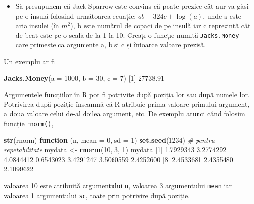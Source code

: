 \documentclass[]{article}
\newenvironment{Shaded}{\begin{snugshade}}{\end{snugshade}}
\newcommand{\KeywordTok}[1]{\textcolor[rgb]{0.13,0.29,0.53}{\textbf{#1}}}
\newcommand{\DataTypeTok}[1]{\textcolor[rgb]{0.13,0.29,0.53}{#1}}
\newcommand{\DecValTok}[1]{\textcolor[rgb]{0.00,0.00,0.81}{#1}}
\newcommand{\FloatTok}[1]{\textcolor[rgb]{0.00,0.00,0.81}{#1}}
\newcommand{\StringTok}[1]{\textcolor[rgb]{0.31,0.60,0.02}{#1}}
\newcommand{\CommentTok}[1]{\textcolor[rgb]{0.56,0.35,0.01}{\textit{#1}}}
\newcommand{\ControlFlowTok}[1]{\textcolor[rgb]{0.13,0.29,0.53}{\textbf{#1}}}
\newcommand{\NormalTok}[1]{#1}
\newenvironment{frshaded*}{%
  \def\FrameCommand{\fboxrule=\FrameRule\fboxsep=\FrameSep \fcolorbox{framecolor}{shadecolor1}}%
  \MakeFramed {\advance\hsize-\width \FrameRestore}}%
{\endMakeFramed}
\newenvironment{rmdblock}[1]
  {\begin{frshaded*}
  \begin{itemize}
  \renewcommand{\labelitemi}{
    \raisebox{-.7\height}[0pt][0pt]{
      {\setkeys{Gin}{width=2em,keepaspectratio}\texttt{[image: images/icons/\#1]}}
    }
  }
  \item
  }
  {
  \end{itemize}
  \end{frshaded*}
  }
\newenvironment{rmdexercise}
  {\begin{rmdblock}{exercise}}
  {\end{rmdblock}}
\begin{document}
\begin{rmdexercise}
Să presupunem că Jack Sparrow este convins că poate prezice cât aur va
găsi pe o insulă folosind următoarea ecuație: \(ab - 324c + \log(a)\),
unde a este aria insulei (în \(m^2\)), b este numărul de copaci de pe
insulă iar c reprezintă cât de beat este pe o scală de la 1 la 10.
Creați o funcție numită \texttt{Jacks.Money} care primește ca argumente
a, b și c și întoarce valoare prezisă.
\end{rmdexercise}

Un exemplu ar fi

\begin{Shaded}
\begin{Highlighting}[]
\KeywordTok{Jacks.Money}\NormalTok{(}\DataTypeTok{a =} \DecValTok{1000}\NormalTok{, }\DataTypeTok{b =} \DecValTok{30}\NormalTok{, }\DataTypeTok{c =} \DecValTok{7}\NormalTok{)}
\NormalTok{[}\DecValTok{1}\NormalTok{] }\FloatTok{27738.91}
\end{Highlighting}
\end{Shaded}

Argumentele funcțiilor în R pot fi potrivite după poziția lor sau după
numele lor. Potrivirea după poziție înseamnă că R atribuie prima valoare
primului argument, a doua valoare celui de-al doilea argument, etc. De
exemplu atunci când folosim funcție \texttt{rnorm()},

\begin{Shaded}
\begin{Highlighting}[]
\KeywordTok{str}\NormalTok{(rnorm)}
\ControlFlowTok{function}\NormalTok{ (n, }\DataTypeTok{mean =} \DecValTok{0}\NormalTok{, }\DataTypeTok{sd =} \DecValTok{1}\NormalTok{)  }
\KeywordTok{set.seed}\NormalTok{(}\DecValTok{1234}\NormalTok{) }\CommentTok{# pentru repetabilitate}
\NormalTok{mydata <-}\StringTok{ }\KeywordTok{rnorm}\NormalTok{(}\DecValTok{10}\NormalTok{, }\DecValTok{3}\NormalTok{, }\DecValTok{1}\NormalTok{) }
\NormalTok{mydata}
\NormalTok{ [}\DecValTok{1}\NormalTok{] }\FloatTok{1.7929343} \FloatTok{3.2774292} \FloatTok{4.0844412} \FloatTok{0.6543023} \FloatTok{3.4291247} \FloatTok{3.5060559} \FloatTok{2.4252600}
\NormalTok{ [}\DecValTok{8}\NormalTok{] }\FloatTok{2.4533681} \FloatTok{2.4355480} \FloatTok{2.1099622}
\end{Highlighting}
\end{Shaded}

valoarea 10 este atribuită argumentului \texttt{n}, valoarea 3
argumentului \texttt{mean} iar valoarea 1 argumentului \texttt{sd},
toate prin potrivire după poziție.
\end{document}
